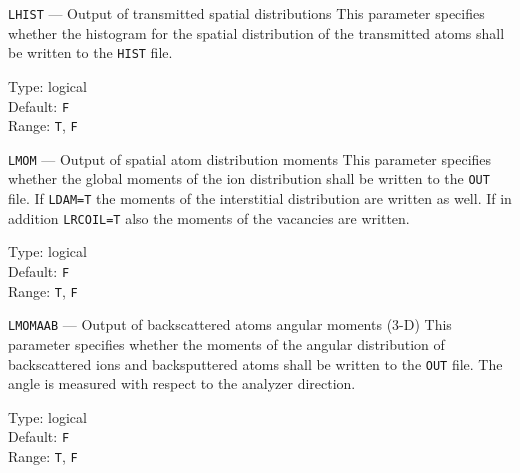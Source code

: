 \begin{keydescription}{\texttt{LHIST} --- Output of transmitted spatial distributions}
%
  This parameter specifies whether the histogram for the spatial distribution of the 
  transmitted atoms shall be written to the \texttt{HIST} file.
  \begin{keytab}
    Type:    \> logical \\
    Default: \> \texttt{F} \\
    Range:   \> \texttt{T}, \texttt{F} 
  \end{keytab}
\end{keydescription}

\iffalse
\begin{keydescription}{\texttt{LLINCOLL} --- Linear collision sequence flag}
%
  This parameter specifies whether linear collision sequences shall be
  analyzed. Currently, only linear collision sequences leading to sputtering
  are analyzed. If a linear collision sequence is identified, \texttt{N, DIRLIN(:)} 
  is appended to the respective line in the \texttt{TRA} file. Here,
  \texttt{N} denotes the length of the linear collision sequence, and
  \texttt{DIRLEN} its direction vector in the crystal coordinate
  system. Linear collision sequences are only identified in crystalline regions
  and are reported only in the \texttt{TRA} file.
  \begin{keytab}
    Type:    \> logical \\
    Default: \> \texttt{F} \\
    Range:   \> \texttt{T}, \texttt{F} 
  \end{keytab}
\end{keydescription}
\fi

\begin{keydescription}{\texttt{LMOM} --- Output of spatial atom distribution moments}
%
  This parameter specifies whether the global moments of the ion distribution shall be written 
  to the \texttt{OUT} file. If \texttt{LDAM=T} the moments of the interstitial distribution are
  written as well. If in addition \texttt{LRCOIL=T} also the moments of the vacancies are 
  written.
  \begin{keytab}
    Type:    \> logical \\
    Default: \> \texttt{F} \\
    Range:   \> \texttt{T}, \texttt{F} 
  \end{keytab}
\end{keydescription}

\begin{keydescription}{\texttt{LMOMAAB} --- Output of backscattered atoms
angular moments (3-D)}
%
  This parameter specifies whether the moments of the angular distribution 
  of backscattered ions and backsputtered atoms shall be written to the
  \texttt{OUT} file. The angle is measured with respect to the analyzer direction.
  \begin{keytab}
    Type:    \> logical \\
    Default: \> \texttt{F} \\
    Range:   \> \texttt{T}, \texttt{F} 
  \end{keytab}
\end{keydescription}

